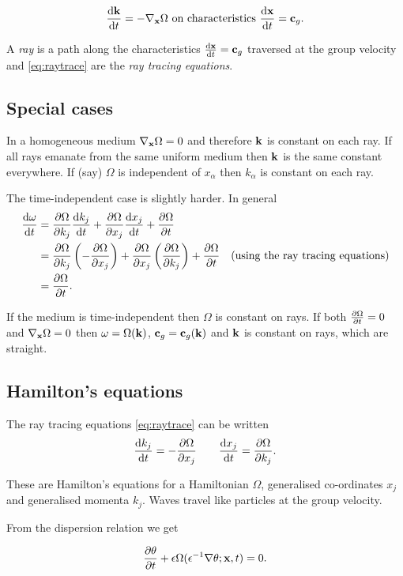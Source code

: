 \documentclass{notes}
\newcommand{\vk}{\vect{k}}
\begin{document}
\begin{equation}\label{eq:raytrace}
\ddt{\vk} = - \nabla_\vx \Omega \text{ on characteristics }
\ddt{\vx} = \vect{c}_g.
\end{equation}

A \emph{ray} is a path along the characteristics $\frac{\mathrm{d}\mathbf{x}}{\mathrm{d} t} =
\mathbf{c}_g$ traversed at the group velocity and \eqref{eq:raytrace}
are the \emph{ray tracing equations}.

\subsection{Special cases}

In a homogeneous medium $\nabla_{\mathbf{x}} \Omega = 0$ and therefore
$\vk$ is constant on each ray.  If all rays emanate from the same
uniform medium then $\vk$ is the same constant everywhere.  If (say)
$\Omega$ is independent of $x_\alpha$ then $k_\alpha$ is constant on
each ray.

The time-independent case is slightly harder.  In general
\begin{align*}
\frac{\mathrm{d}\omega}{\mathrm{d} t} &= \frac{\partial \Omega}{\partial k_j} \frac{\mathrm{d} k_j}{\mathrm{d} t} + \frac{\partial \Omega}{\partial x_j}
\frac{\mathrm{d} x_j}{\mathrm{d} t} + \frac{\partial \Omega}{\partial t} \\
&= \frac{\partial \Omega}{\partial k_j} \left( - \frac{\partial \Omega}{\partial x_j} \right)
+ \frac{\partial \Omega}{\partial x_j} \left( \frac{\partial \Omega}{\partial k_j} \right) + \frac{\partial \Omega}{\partial t}
\quad \text{(using the ray tracing equations)} \\
& = \frac{\partial \Omega}{\partial t}.
\end{align*}

If the medium is time-independent then $\Omega$ is constant on rays.
If both $\frac{\partial \Omega}{\partial t} = 0$ and $\nabla_{\mathbf{x}} \Omega = 0$ then
$\omega = \Omega(\vk)$, $\vect{c}_g = \vect{c}_g(\vk)$ and $\vk$ is
constant on rays, which are straight.

\subsection{Hamilton's equations}

The ray tracing equations \eqref{eq:raytrace} can be written
\[
\frac{\mathrm{d} k_j}{\mathrm{d} t} = - \frac{\partial \Omega}{\partial x_j} \qquad \frac{\mathrm{d} x_j}{\mathrm{d} t}  = \frac{\partial \Omega}{\partial k_j}.
\]

These are Hamilton's equations for a Hamiltonian $\Omega$, generalised
co-ordinates $x_j$ and generalised momenta $k_j$.  Waves travel like
particles at the group velocity.

From the dispersion relation we get

\[
\frac{\partial \theta}{\partial t} + \epsilon \Omega(\epsilon^{-1} \nabla \theta; \mathbf{x},t) = 0.
\]
\end{document}
